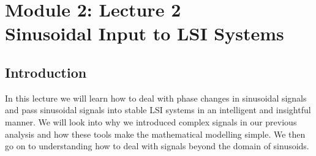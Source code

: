 \section{Module 2: Lecture 2\\Sinusoidal Input to LSI Systems}


\subsection{Introduction}
In this lecture we will learn how to deal with phase changes in sinusoidal signals and pass sinusoidal signals into stable LSI systems in an intelligent and insightful manner. We will look into why we introduced complex signals in our previous analysis and how these tools make the mathematical modelling simple. We then go on to understanding how to deal with signals beyond the domain of sinusoids.


